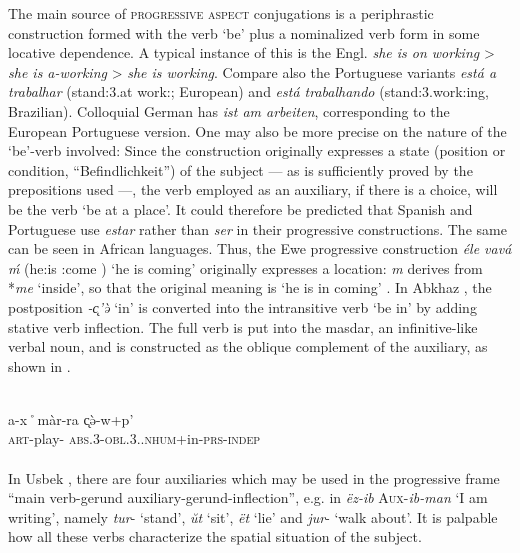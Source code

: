 \label{page33}The main source of \textsc{progressive aspect} conjugations is a periphrastic construction formed with the verb ‘be’ plus  a nominalized verb form in some locative dependence. A typical instance of this is the Engl. \textit{she is on working} {\textgreater} \textit{she is a-working} {\textgreater} \textit{she is working}. Compare also the Portuguese variants \textit{está a trabalhar} (stand:3.\glsg at work:\glinf; European) and \textit{está trabalhando} (stand:3.\glsg work:ing, Brazilian). Colloquial German has \textit{ist am arbeiten}, corresponding to the European Portuguese version. One may also be more precise on the nature of the ‘be’-verb involved: Since the construction originally expresses a state (position or condition, ``Befindlichkeit'') of the subject — as is sufficiently proved by the prepositions used —, the verb employed as an auxiliary, if there is a choice, will be the verb ‘be at a place’. It could therefore be predicted that Spanish and Portuguese use \textit{estar} rather than \textit{ser} in their progressive constructions. The same can be seen in African languages. Thus, the Ewe progressive construction \textit{éle vavá \'m} (he:is \rdp:come \glprog) ‘he is coming’ originally expresses a location: \textit{m} derives from *\textit{me} ‘inside’, so that the original meaning is ‘he is in coming’ \citep[105f]{Heine1980}. In Abkhaz \citep[128, 181f]{Hewitt1979}, the postposition \textit{-\k{c}'\`ə} ‘in’ is converted into the intransitive verb ‘be in’ by adding stative verb inflection. The full verb is put into the masdar, an infinitive-like verbal noun, and is constructed as the oblique complement of the auxiliary, as shown in .

\ea\label{ex:E3} 
\\
 \gll a-x˚màr-ra  \k{c}\`ə-w+p'\\
{\textsc{art}-play-\glinf}  \textsc{abs}.3-\textsc{obl}.3.\glsg.\textsc{nhum}+in-\textsc{prs}-\textsc{indep}\\
\\
\z
\noindent In Usbek \citep[86]{Žirmunskij1966}, there are four auxiliaries which may be used in the progressive frame ``main verb-gerund auxiliary-gerund-inflection'', e.g. in \textit{ëz-ib} \textsc{Aux}{}-\textit{ib-man} ‘I am writing’, namely \textit{tur}{}- ‘stand’, \textit{\u{u}t} ‘sit’, \textit{ët }‘lie’ and \textit{jur}{}- ‘walk about’. It is palpable how all these verbs characterize the spatial situation of the subject.

